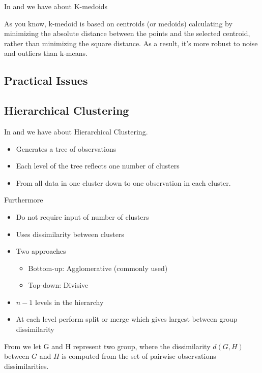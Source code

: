 In \cite[515]{friedman2016elements} and \cite[p.~20]{lecture7} we have about K-medoids

As you know, k-medoid is based on centroids (or medoids) calculating by minimizing the absolute distance between the points and the selected centroid, rather than minimizing the square distance. As a result, it's more robust to noise and outliers than k-means.

\subsection{Practical Issues}

\subsection{Hierarchical Clustering}

In \cite[520]{friedman2016elements} and \cite[p.~22]{lecture7} we have about Hierarchical Clustering.

\begin{itemize}
  \item Generates a tree of observations
  \item Each level of the tree reflects one number of clusters
  \item From all data in one cluster down to one observation in each cluster.
\end{itemize}

Furthermore

\begin{itemize}
  \item Do not require input of number of clusters
  \item Uses dissimilarity between clusters
  \item Two approaches
  \begin{itemize}
    \item Bottom-up: Agglomerative (commonly used)
    \item Top-down: Divisive
  \end{itemize}
  \item $n - 1$ levels in the hierarchy
  \item At each level perform split or merge which gives largest between group dissimilarity
\end{itemize}

From \cite[523]{friedman2016elements} we let G and H represent two group, where the dissimilarity $d(G, H)$ between $G$ and $H$ is computed from the set of pairwise observations dissimilarities.

